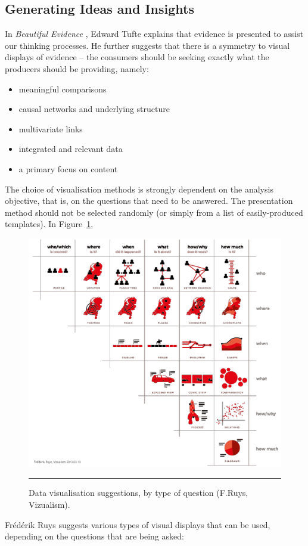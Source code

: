 \subsection{Generating Ideas and Insights} In \textit{Beautiful Evidence} \cite{DV_T2}, Edward Tufte explains that evidence is presented to assist our thinking processes. He further suggests that there is a symmetry to visual displays of evidence -- the consumers should be seeking exactly what the producers should be providing, namely:
\begin{itemize}[noitemsep, topsep=2pt]
\item meaningful comparisons
\item causal networks and underlying structure
\item multivariate links
\item integrated and relevant data
\item a primary focus on content
\end{itemize}
\vspace{3pt}
The choice of visualisation methods is strongly dependent on the analysis objective, that is, on the questions that need to be answered. The presentation method should not be selected randomly (or simply from a list of easily-produced templates). \newl In Figure~\ref{fig:5W},
\begin{figure}[!t]
\centering
\includegraphics[width=\textwidth]{Images/5W_Ruys.png}
\caption[\small Data visualisation suggestions, by type of question ]{\small Data visualisation suggestions, by type of question (F.Ruys, Vizualism).} \hrule\label{fig:5W}
\end{figure}
 Fr\'ed\'erik Ruys suggests various types of visual displays that can be used, depending on the questions that are being asked:   


